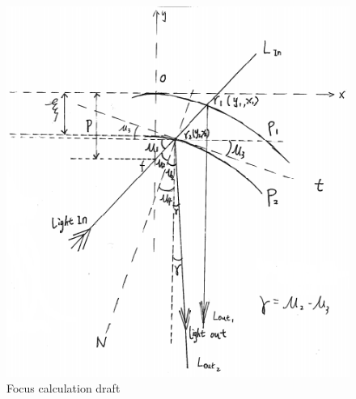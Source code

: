 \begin{figure}[ht!]
\centering
\includegraphics[scale = 1.2]{chapters/img/focus.png}
\caption{Focus calculation draft}
\label{fig:focus}
\end{figure}

